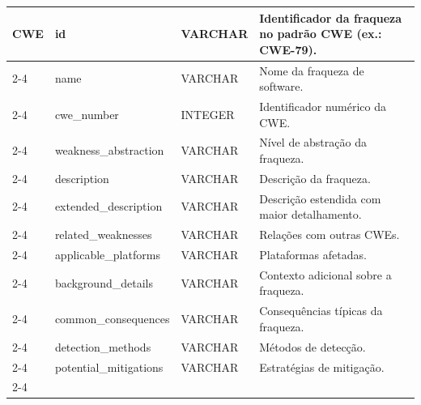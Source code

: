 \begin{table}[H]
{\begin{tabular}{|p{2.2cm}|p{3.3cm}|p{1.9cm}|p{8.4cm}|}
            \multirow{15}{*}{CWE}
                              & id                     & VARCHAR       & Identificador da fraqueza no padrão CWE (ex.: CWE-79).                                                \\ \cline{2-4}
                              & name                   & VARCHAR       & Nome da fraqueza de software.                                                                         \\ \cline{2-4}
                              & cwe\_number            & INTEGER       & Identificador numérico da CWE.                                                                        \\ \cline{2-4}
                              & weakness\_abstraction  & VARCHAR       & Nível de abstração da fraqueza.                                                                       \\ \cline{2-4}
                              & description            & VARCHAR       & Descrição da fraqueza.                                                                                \\ \cline{2-4}
                              & extended\_description  & VARCHAR       & Descrição estendida com maior detalhamento.                                                           \\ \cline{2-4}
                              & related\_weaknesses    & VARCHAR       & Relações com outras CWEs.                                                                             \\ \cline{2-4}
                              & applicable\_platforms  & VARCHAR       & Plataformas afetadas.                                                                                 \\ \cline{2-4}
                              & background\_details    & VARCHAR       & Contexto adicional sobre a fraqueza.                                                                  \\ \cline{2-4}
                              & common\_consequences   & VARCHAR       & Consequências típicas da fraqueza.                                                                    \\ \cline{2-4}
                              & detection\_methods     & VARCHAR       & Métodos de detecção.                                                                                  \\ \cline{2-4}
                              & potential\_mitigations & VARCHAR       & Estratégias de mitigação.                                                                             \\ \cline{2-4}

\end{tabular}}
\end{table}

